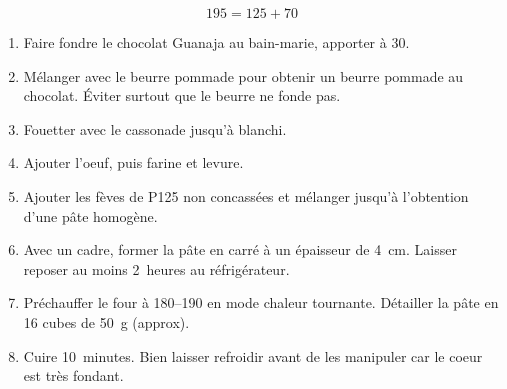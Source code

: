 
\begin{displaymath}
  195 = 125 + 70
\end{displaymath}

\begin{ingredients}
\end{ingredients}


\begin{recipe}
  \begin{enumerate}

  \item Faire fondre le chocolat Guanaja au  bain-marie, apporter à 30\degreeC{}.

  \item Mélanger avec le beurre pommade pour obtenir un beurre pommade
    au chocolat.  Éviter surtout que le beurre ne fonde pas.

  \item Fouetter avec le cassonade jusqu'à blanchi.

  \item Ajouter l'oeuf, puis farine et levure.

  \item Ajouter les fèves de P125 non concassées et mélanger jusqu'à
    l'obtention d'une pâte homogène.

  \item Avec un cadre, former la pâte en carré à un épaisseur de
    4~cm.  Laisser reposer au moins 2~heures au réfrigérateur.

  \item Préchauffer le four à 180--190\degreeC{} en mode chaleur
    tournante.  Détailler la pâte en 16 cubes de 50~g (approx).

  \item Cuire 10~minutes.  Bien laisser refroidir avant de les
    manipuler car le coeur est très fondant.

  \end{enumerate}
\end{recipe}

